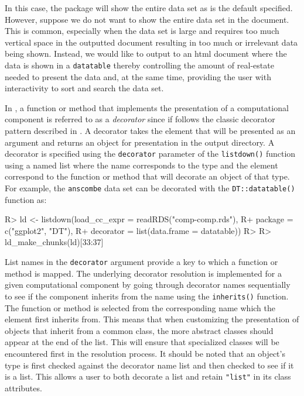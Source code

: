 \documentclass[
]{jss}
\begin{document}
In this case, the  package will show the entire data set
as is the default specified. However, suppose we do not want to show the
entire data set in the document. This is common, especially when the
data set is large and requires too much vertical space in the outputted
document resulting in too much or irrelevant data being shown. Instead,
we would like to output to an html document where the data is shown in a
\texttt{datatable} thereby controlling the amount of real-estate needed
to present the data and, at the same time, providing the user with
interactivity to sort and search the data set.

In , a function or method that implements the presentation
of a computational component is referred to as a \emph{decorator} since
if follows the classic decorator pattern described in \citet{gamma1995}.
A decorator takes the element that will be presented as an argument and
returns an object for presentation in the output directory. A decorator
is specified using the \texttt{decorator} parameter of the
\texttt{listdown()} function using a named list where the name
corresponds to the type and the element correspond to the function or
method that will decorate an object of that type. For example, the
\texttt{anscombe} data set can be decorated with the
\texttt{DT::datatable()} function \citep{xie2020} as:

\begin{CodeChunk}

\begin{CodeInput}
R> ld <- listdown(load_cc_expr = readRDS("comp-comp.rds"), 
R+                package = c("ggplot2", "DT"),
R+                decorator = list(data.frame = datatable))
R> 
R> ld_make_chunks(ld)[33:37]
\end{CodeInput}

\end{CodeChunk}

List names in the \texttt{decorator} argument provide a key to which a
function or method is mapped. The underlying decorator resolution is
implemented for a given computational component by going through
decorator names sequentially to see if the component inherits from the
name using the \texttt{inherits()} function. The function or method is
selected from the corresponding name which the element first inherits
from. This means that when customizing the presentation of objects that
inherit from a common class, the more abstract classes should appear at
the end of the list. This will ensure that specialized classes will be
encountered first in the resolution process. It should be noted that an
object's type is first checked against the decorator name list and then
checked to see if it is a list. This allows a user to both decorate a
list and retain \texttt{"list"} in its class attributes.
\end{document}
